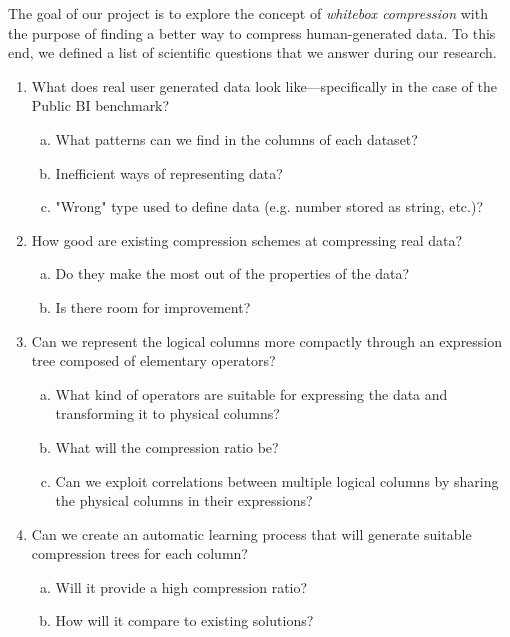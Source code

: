 The goal of our project is to explore the concept of \emph{whitebox compression} with the purpose of finding a better way to compress human-generated data. To this end, we defined a list of scientific questions that we answer during our research.
\begin{enumerate}[1)]
    \item What does real user generated data look like---specifically in the case of the Public BI benchmark?
    \begin{enumerate}[a)]
        \item What patterns can we find in the columns of each dataset?
        \item Inefficient ways of representing data?
        \item "Wrong" type used to define data (e.g. number stored as string, etc.)?
    \end{enumerate}
    \item How good are existing compression schemes at compressing real data?
    \begin{enumerate}[a)]
        \item Do they make the most out of the properties of the data?
        \item Is there room for improvement?
    \end{enumerate}
    \item Can we represent the logical columns more compactly through an expression tree composed of elementary operators?
    \begin{enumerate}[a)]
        \item What kind of operators are suitable for expressing the data and transforming it to physical columns?
        \item What will the compression ratio be?
        \item Can we exploit correlations between multiple logical columns by sharing the physical columns in their expressions?
    \end{enumerate}
    \item Can we create an automatic learning process that will generate suitable compression trees for each column?
    \begin{enumerate}[a)]
        \item Will it provide a high compression ratio?
        \item How will it compare to existing solutions?
    \end{enumerate}
\end{enumerate}

